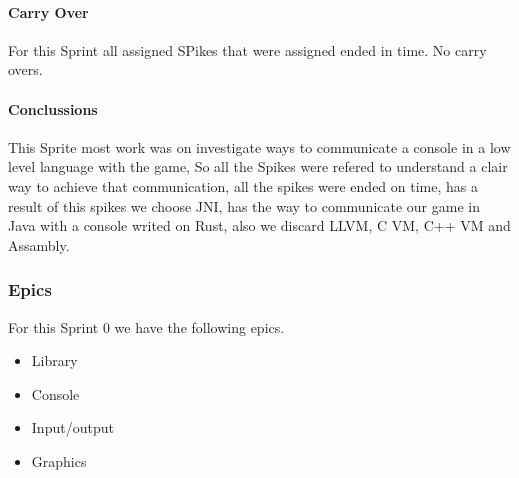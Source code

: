 \paragraph{Carry Over}
For this Sprint all assigned SPikes that were assigned ended in time. No carry overs.

\paragraph{Conclussions}
This Sprite most work was on investigate ways to communicate a console in a low level language with the game, So all the Spikes were refered to understand a clair way to achieve that communication, all the spikes were ended on time, has a result of this spikes we choose JNI, has the way to communicate our game in Java with a console writed on Rust, also we discard LLVM, C VM, C++ VM and Assambly.

\subsubsection{Epics}
For this Sprint 0 we have the following epics.
\begin{itemize}
    \item Library
    \item Console
    \item Input/output
    \item Graphics
\end{itemize}

